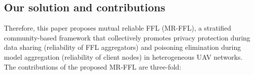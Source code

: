 \documentclass[lettersize,journal]{IEEEtran}
\begin{document}
\subsection{Our solution and contributions}
Therefore, this paper proposes mutual reliable FFL (MR-FFL), a stratified community-based framework that collectively promotes privacy protection during data sharing (reliability of FFL aggregators) and poisoning elimination during model aggregation (reliability of client nodes) in heterogeneous UAV networks. The contributions of the proposed MR-FFL are three-fold:


\end{document}
